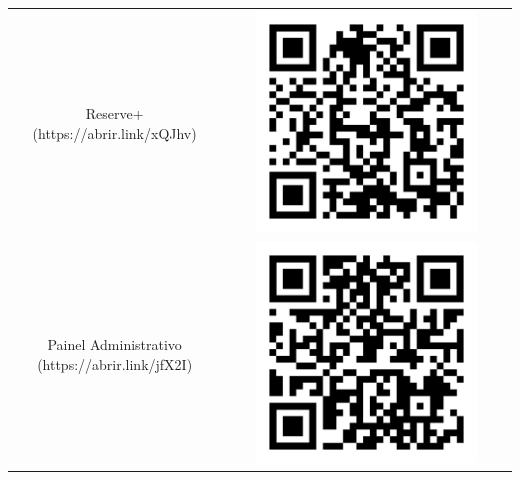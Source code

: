 \documentclass[12pt]{article}
\begin{document}
\begin{table}[ht]
\begin{tabular}{ |c|c| }
\begin{minipage}{.3\textwidth}
 \end{minipage}
 \\ 
 \hline
 Reserve+ (https://abrir.link/xQJhv) & 
  \begin{minipage}{.3\textwidth}
    \centering
    \includegraphics[width=0.8\textwidth]{reserve+.jpg}
 \end{minipage}
 \\
 \hline
 Painel Administrativo (https://abrir.link/jfX2I) & 
  \begin{minipage}{.3\textwidth}
    \centering
    \includegraphics[width=0.8\textwidth]{administrativo.jpg}
 \end{minipage}
 \\ 
 \hline
\end{tabular}
\end{table}
\end{document}
